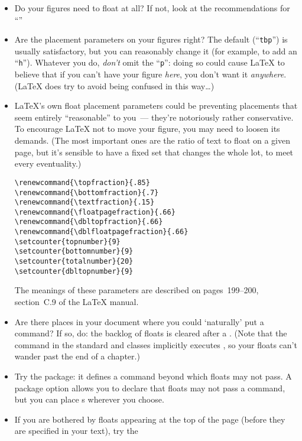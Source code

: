 \begin{itemize}
\item Do your figures need to float at all?  If not, look at the
  recommendations for ``''
\item Are the placement parameters on your figures right?  The
  default (``\texttt{tbp}'') is usually satisfactory, but you can
  reasonably change it (for example, to add an ``\texttt{h}'').
  Whatever you do, \emph{don't} 
  omit the ``\texttt{p}'': doing so could cause \LaTeX{} to believe that if you
  can't have your figure \emph{here}, you don't want it
  \emph{anywhere}.  (\LaTeX{} does try to avoid being confused in
  this way\dots{})
\item \LaTeX{}'s own float placement parameters could be preventing
  placements that seem entirely ``reasonable'' to you~--- they're
  notoriously rather conservative.  To encourage \LaTeX{} not to move
  your figure, you may need to loosen its demands.  (The most important
  ones are the ratio of text to float on a given page, but it's
  sensible to have a fixed set that changes the whole lot, to meet
  every eventuality.)
\begin{verbatim}
\renewcommand{\topfraction}{.85}
\renewcommand{\bottomfraction}{.7}
\renewcommand{\textfraction}{.15}
\renewcommand{\floatpagefraction}{.66}
\renewcommand{\dbltopfraction}{.66}
\renewcommand{\dblfloatpagefraction}{.66}
\setcounter{topnumber}{9}
\setcounter{bottomnumber}{9}
\setcounter{totalnumber}{20}
\setcounter{dbltopnumber}{9}
\end{verbatim}
  The meanings of these
  parameters are described on pages~199--200, section~C.9 of the
  \LaTeX{} manual.
\item Are there places in your document where you could `naturally'
  put a  command?  If so, do: the backlog of floats is
  cleared after a .  (Note that the 
  command in the standard  and  classes
  implicitly executes , so your floats can't wander past
  the end of a chapter.)
\item Try the  package: it defines a
   command beyond which floats may not pass.  A
  package option allows you to declare that floats may not pass a
   command, but you can place s wherever
  you choose.
\item If you are bothered by floats appearing at the top of the page
  (before they are specified in your text), try the 

\end{itemize}
